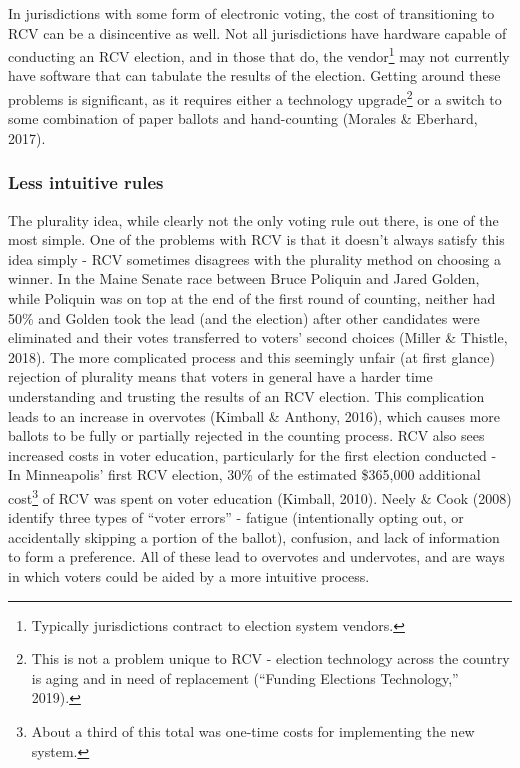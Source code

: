 \documentclass[12pt,twoside]{reedthesis}
\begin{document}
In jurisdictions with some form of electronic voting, the cost of transitioning to RCV can be a disincentive as well. Not all jurisdictions have hardware capable of conducting an RCV election, and in those that do, the vendor\footnote{Typically jurisdictions contract to election system vendors.} may not currently have software that can tabulate the results of the election. Getting around these problems is significant, as it requires either a technology upgrade\footnote{This is not a problem unique to RCV - election technology across the country is aging and in need of replacement (``Funding Elections Technology,'' 2019).} or a switch to some combination of paper ballots and hand-counting (Morales \& Eberhard, 2017).

\hypertarget{less-intuitive-rules}{%
\subsubsection{Less intuitive rules}\label{less-intuitive-rules}}

The plurality idea, while clearly not the only voting rule out there, is one of the most simple. One of the problems with RCV is that it doesn't always satisfy this idea simply - RCV sometimes disagrees with the plurality method on choosing a winner. In the Maine Senate race between Bruce Poliquin and Jared Golden, while Poliquin was on top at the end of the first round of counting, neither had 50\% and Golden took the lead (and the election) after other candidates were eliminated and their votes transferred to voters' second choices (Miller \& Thistle, 2018). The more complicated process and this seemingly unfair (at first glance) rejection of plurality means that voters in general have a harder time understanding and trusting the results of an RCV election. This complication leads to an increase in overvotes (Kimball \& Anthony, 2016), which causes more ballots to be fully or partially rejected in the counting process. RCV also sees increased costs in voter education, particularly for the first election conducted - In Minneapolis' first RCV election, 30\% of the estimated \$365,000 additional cost\footnote{About a third of this total was one-time costs for implementing the new system.} of RCV was spent on voter education (Kimball, 2010). Neely \& Cook (2008) identify three types of ``voter errors'' - fatigue (intentionally opting out, or accidentally skipping a portion of the ballot), confusion, and lack of information to form a preference. All of these lead to overvotes and undervotes, and are ways in which voters could be aided by a more intuitive process.
\end{document}
